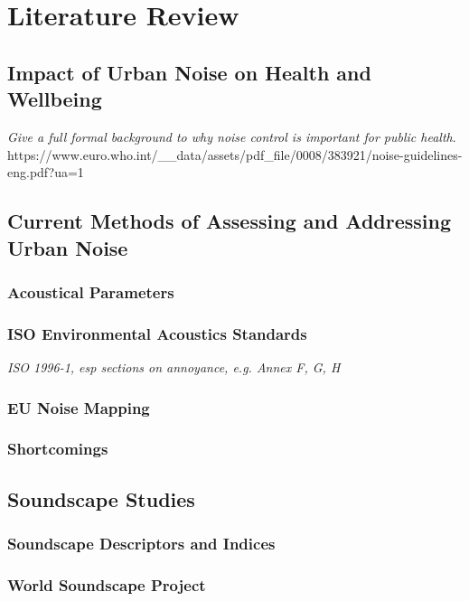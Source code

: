 \chapter{Literature Review}
\label{ch:lit}

\section{Impact of Urban Noise on Health and Wellbeing}

  \emph{Give a full formal background to why noise control is important for public health}.
  https://www.euro.who.int/__data/assets/pdf_file/0008/383921/noise-guidelines-eng.pdf?ua=1
\section{Current Methods of Assessing and Addressing Urban Noise}

  \subsection{Acoustical Parameters}

  \subsection{ISO Environmental Acoustics Standards}
    \emph{ISO 1996-1, esp sections on annoyance, e.g. Annex F, G, H}

  \subsection{EU Noise Mapping}

  \subsection{Shortcomings}

\section{Soundscape Studies}

  \subsection{Soundscape Descriptors and Indices}

  \subsection{World Soundscape Project}

